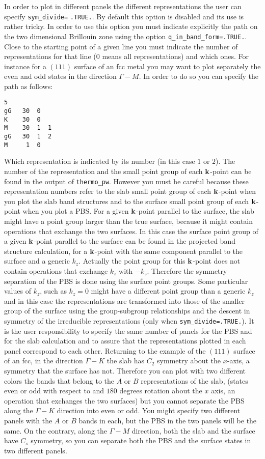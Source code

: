 \documentclass[12pt,a4paper]{article}
\begin{document}
In order to plot in different panels the different representations
the user can specify \texttt{sym\_divide=} \texttt{.TRUE.}.
By default this option is disabled and its use is rather tricky.
In order to use this option you must indicate explicitly the
path on the two dimensional Brillouin zone using the option
\texttt{q\_in\_band\_form=.TRUE.}. Close to the
starting point of a given line you must indicate the number of 
representations for that line ($0$ means all representations) and which ones.
For instance for a $(111)$ surface of an fcc metal you may
want to plot separately the even and odd states in the direction 
$\Gamma-M$. In order to do so you can specify the path as follows:
\begin{verbatim}
5
gG   30  0
K    30  0
M    30  1  1
gG   30  1  2
M     1  0
\end{verbatim}
Which representation is indicated by its number (in this case $1$ or $2$).
The number of the representation and the small point group of each 
${\bf k}$-point can be found in the output of \texttt{thermo\_pw}.
However you must be careful because these representation numbers refer
to the slab small point group of each ${\bf k}$-point when you
plot the slab band structures and to the surface small point 
group of each ${\bf k}$-point when you plot a PBS.
For a given ${\bf k}$-point parallel to the surface, the slab
might have a point group larger than the true surface, because it 
might contain operations that exchange the two surfaces.
In this case the surface point group of a given ${\bf k}$-point parallel 
to the surface can be found in the projected band structure calculation,
for a ${\bf k}$-point with the same component parallel to the surface
and a generic $k_z$. Actually the point group for this ${\bf k}$-point 
does not contain operations that exchange $k_z$ with $-k_z$.
Therefore the symmetry separation of the PBS is done using the
surface point groups. Some particular values of $k_z$, such as $k_z=0$
might have a different point group than a generic $k_z$ and in this
case the representations are transformed into those of the smaller
group of the surface using the group-subgroup relationships and
the descent in symmetry of the irreducible representations
(only when \texttt{sym\_divide=.TRUE.}).
It is the user responsibility to specify the same number of panels
for the PBS and for the slab calculation and to assure that the
representations plotted in each panel correspond to each other.
Returning to the example of the $(111)$ surface of an fcc, in the direction
$\Gamma-K$ the slab has $C_2$ symmetry about the $x$-axis, a symmetry
that the surface has not. Therefore you can plot with two different colors
the bands that belong to the $A$ or $B$ representations of the slab,
(states even or odd with respect to and $180$ degrees rotation about
the $x$ axis, an operation that exchanges the two surfaces)
but you cannot separate the PBS along the $\Gamma-K$ direction into
even or odd. You might specify two different panels with the
$A$ or $B$ bands in each, but the PBS in the two panels will be the same. 
On the contrary, along the $\Gamma-M$ direction, both the slab and 
the surface have $C_s$ symmetry, so you can separate both the PBS 
and the surface states in two different panels.
\end{document}
